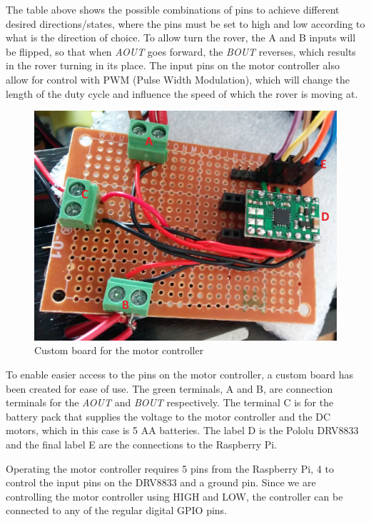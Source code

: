 The table above shows the possible combinations of pins to achieve different desired directions/states, where the pins must be set to high and low according to what is the direction of choice. To allow turn the rover, the A and B inputs will be flipped, so that when \textit{AOUT} goes forward, the \textit{BOUT} reverses, which results in the rover turning in its place.
The input pins on the motor controller also allow for control with PWM (Pulse Width Modulation), which will change the length of the duty cycle and influence the speed of which the rover is moving at\cite{DRV8833}.

\begin{figure}[H]
	\centering
	\includegraphics[width=.5\linewidth]{images/labelled.jpg}
	\caption{Custom board for the motor controller}
	\label{fig:customboardmc}	
\end{figure}

To enable easier access to the pins on the motor controller, a custom board has been created for ease of use. The green terminals, A and B, are connection terminals for the \textit{AOUT} and \textit{BOUT} respectively. The terminal C is for the battery pack that supplies the voltage to the motor controller and the DC motors, which in this case is 5 AA batteries. The label D is the Pololu DRV8833 and the final label E are the connections to the Raspberry Pi. 

Operating the motor controller requires 5 pins from the Raspberry Pi, 4 to control the input pins on the DRV8833 and a ground pin. Since we are controlling the motor controller using HIGH and LOW, the controller can be connected to any of the regular digital GPIO pins.